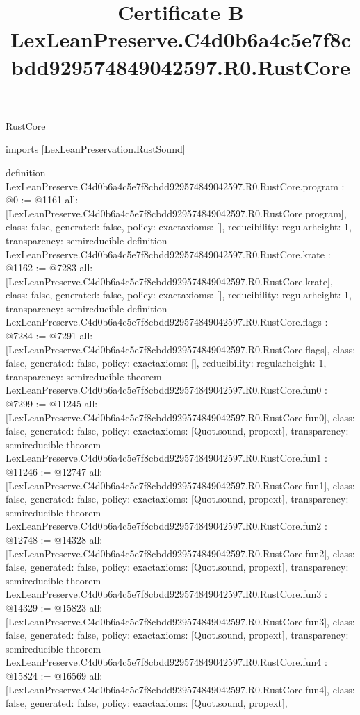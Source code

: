 \begin{lexlean}{RustCore}
\title{Certificate B LexLeanPreserve.C4d0b6a4c5e7f8cbdd929574849042597.R0.RustCore}
\begin{coremodule}
imports [LexLeanPreservation.RustSound]

definition LexLeanPreserve.C4d0b6a4c5e7f8cbdd929574849042597.R0.RustCore.program : @0 := @1161 {
  all: [LexLeanPreserve.C4d0b6a4c5e7f8cbdd929574849042597.R0.RustCore.program],
  class: false,
  generated: false,
  policy: exact{axioms: []},
  reducibility: regular{height: 1},
  transparency: semireducible
}
definition LexLeanPreserve.C4d0b6a4c5e7f8cbdd929574849042597.R0.RustCore.krate : @1162 := @7283 {
  all: [LexLeanPreserve.C4d0b6a4c5e7f8cbdd929574849042597.R0.RustCore.krate],
  class: false,
  generated: false,
  policy: exact{axioms: []},
  reducibility: regular{height: 1},
  transparency: semireducible
}
definition LexLeanPreserve.C4d0b6a4c5e7f8cbdd929574849042597.R0.RustCore.flags : @7284 := @7291 {
  all: [LexLeanPreserve.C4d0b6a4c5e7f8cbdd929574849042597.R0.RustCore.flags],
  class: false,
  generated: false,
  policy: exact{axioms: []},
  reducibility: regular{height: 1},
  transparency: semireducible
}
theorem LexLeanPreserve.C4d0b6a4c5e7f8cbdd929574849042597.R0.RustCore.fun0 : @7299 := @11245 {
  all: [LexLeanPreserve.C4d0b6a4c5e7f8cbdd929574849042597.R0.RustCore.fun0],
  class: false,
  generated: false,
  policy: exact{axioms: [Quot.sound, propext]},
  transparency: semireducible
}
theorem LexLeanPreserve.C4d0b6a4c5e7f8cbdd929574849042597.R0.RustCore.fun1 : @11246 := @12747 {
  all: [LexLeanPreserve.C4d0b6a4c5e7f8cbdd929574849042597.R0.RustCore.fun1],
  class: false,
  generated: false,
  policy: exact{axioms: [Quot.sound, propext]},
  transparency: semireducible
}
theorem LexLeanPreserve.C4d0b6a4c5e7f8cbdd929574849042597.R0.RustCore.fun2 : @12748 := @14328 {
  all: [LexLeanPreserve.C4d0b6a4c5e7f8cbdd929574849042597.R0.RustCore.fun2],
  class: false,
  generated: false,
  policy: exact{axioms: [Quot.sound, propext]},
  transparency: semireducible
}
theorem LexLeanPreserve.C4d0b6a4c5e7f8cbdd929574849042597.R0.RustCore.fun3 : @14329 := @15823 {
  all: [LexLeanPreserve.C4d0b6a4c5e7f8cbdd929574849042597.R0.RustCore.fun3],
  class: false,
  generated: false,
  policy: exact{axioms: [Quot.sound, propext]},
  transparency: semireducible
}
theorem LexLeanPreserve.C4d0b6a4c5e7f8cbdd929574849042597.R0.RustCore.fun4 : @15824 := @16569 {
  all: [LexLeanPreserve.C4d0b6a4c5e7f8cbdd929574849042597.R0.RustCore.fun4],
  class: false,
  generated: false,
  policy: exact{axioms: [Quot.sound, propext]},
}
\end{coremodule}
\end{lexlean}
